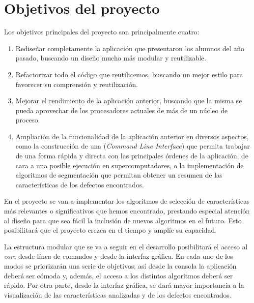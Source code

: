 \chapter{Objetivos del proyecto}

Los objetivos principales del proyecto son principalmente cuatro:
\begin{enumerate}
 \item Rediseñar completamente la aplicación que presentaron los alumnos del año pasado, buscando un diseño mucho más modular y reutilizable.
 \item Refactorizar todo el código que reutilicemos, buscando un mejor estilo para favorecer su comprensión y reutilización.
 \item Mejorar el rendimiento de la aplicación anterior, buscando que la misma se pueda aprovechar de los procesadores actuales de más de un núcleo de proceso.
 \item Ampliación de la funcionalidad de la aplicación anterior en diversos aspectos, como la construcción de una \cli{} (\textit{Command Line Interface}) que permita trabajar de una forma rápida y directa con las principales órdenes de la aplicación, de cara a una posible ejecución en supercomputadores, o la implementación de algoritmos de segmentación que permitan obtener un resumen de las características de los defectos encontrados.
\end{enumerate}

En el proyecto se van a implementar los algoritmos de selección de características más relevantes o significativos que hemos encontrado, prestando especial atención al diseño para que sea fácil la inclusión de nuevos algoritmos en el futuro. Esto posibilitará que el proyecto crezca en el tiempo y amplíe su capacidad.

La estructura modular que se va a seguir en el desarrollo posibilitará el acceso al \textit{core} desde línea de comandos y desde la interfaz gráfica. En cada uno de los modos se priorizarán una serie de objetivos; así desde la consola la aplicación deberá ser cómoda y, además, el acceso a los distintos algoritmos deberá ser rápido. Por otra parte, desde la interfaz gráfica, se dará mayor importancia a la visualización de las características analizadas y de los defectos encontrados.

